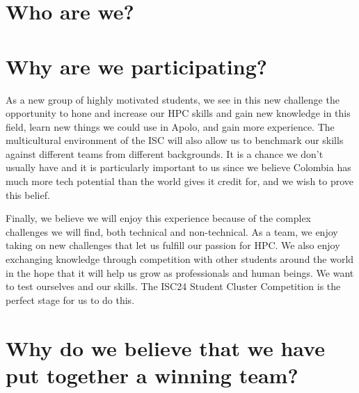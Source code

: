 \documentclass[11pt,a4paper,twocolumn]{article}
\begin{document}
\setlength{\parindent}{4em}
%



\section{Who are we?}

\section{Why are we participating?}

As a new group of highly motivated students, we see in this new challenge the opportunity to hone and increase our HPC skills and gain new knowledge in this field, learn new things we could use in Apolo, and gain more experience. The multicultural environment of the ISC will also allow us to benchmark our skills against different teams from different backgrounds. It is a chance we don’t usually have and it is particularly important to us since we believe Colombia has much more tech potential than the world gives it credit for, and we wish to prove this belief.

Finally, we believe we will enjoy this experience because of the complex challenges we will find, both technical and non-technical. As a team, we enjoy taking on new challenges that let us fulfill our passion for HPC. We also enjoy exchanging knowledge through competition with other students around the world in the hope that it will help us grow as professionals and human beings. We want to test ourselves and our skills. The ISC24 Student Cluster Competition is the perfect stage for us to do this.

\section{Why do we believe that we have put together a winning team?}
\end{document}
